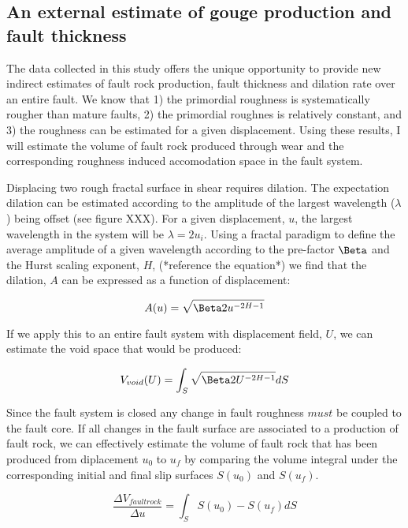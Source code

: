 \documentclass[12pt,a4paper]{article}
\begin{document}
	\subsection{An external estimate of gouge production and fault thickness}

The data collected in this study offers the unique opportunity to provide new indirect estimates of fault rock production, fault thickness and dilation rate over an entire fault. We know that 1) the primordial roughness is systematically rougher than mature faults, 2) the primordial roughnes is relatively constant, and 3) the roughness can be estimated for a given displacement. Using these results, I will estimate the volume of fault rock produced through wear and the corresponding roughness induced accomodation space in the fault system.

Displacing two rough fractal surface in shear requires dilation. The expectation dilation can be estimated according to the amplitude of the largest wavelength ($\lambda$) being offset (see figure XXX). For a given displacement, $u$, the largest wavelength in the system will be $\lambda = 2u_i$. Using a fractal paradigm to define the average amplitude of a given wavelength according to the pre-factor $\Beta$ and the Hurst scaling exponent, $H$, (*reference the equation*) we find that the dilation, $A$ can be expressed as a function of displacement:

\begin{equation}
	A(u) = \sqrt{\Beta 2u^{-2H-1}}
\end{equation}

If we apply this to an entire fault system with displacement field, $U$, we can estimate the void space that would be produced:

\begin{equation}
	V_{void}(U) = \int_S \sqrt{\Beta 2U^{-2H-1}}dS
\end{equation}

Since the fault system is closed any change in fault roughness $must$ be coupled to the fault core. If all changes in the fault surface are associated to a production of fault rock, we can effectively estimate the volume of fault rock that has been produced from diplacement $u_0$ to $u_f$ by comparing the volume integral under the corresponding initial and final slip surfaces $S(u_0)$ and $S(u_f)$.

\begin{equation}
	\dfrac {\Delta V_{fault rock}}{\Delta u} = \int_S S(u_0) - S(u_f) dS
\end{equation}
\end{document}
